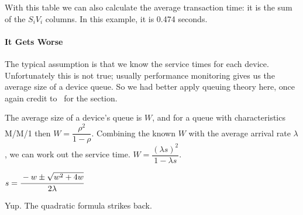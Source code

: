 With this table we can also calculate the average transaction time: it is the sum of the $S_{i}V_{i}$ columns. In this example, it is 0.474 seconds. 

\paragraph*{It Gets Worse}

The typical assumption is that we know the service times for each device. Unfortunately this is not true; usually performance monitoring gives us the average size of a device queue. So we had better apply queuing theory here, once again credit to~\cite{williams-calc} for the section. 

The average size of a device's queue is $W$, and for a queue with characteristics M/M/1 then $W = \dfrac{\rho^{2}}{1-\rho}$. Combining the known $W$ with the average arrival rate $\lambda$, we can work out the service time. $W = \dfrac{(\lambda s)^{2}}{1 - \lambda s}$.

\begin{center}
	$s = \cfrac{-w \pm \sqrt{w^{2}+4w}}{2\lambda}$
\end{center}

Yup. The quadratic formula strikes back. 




